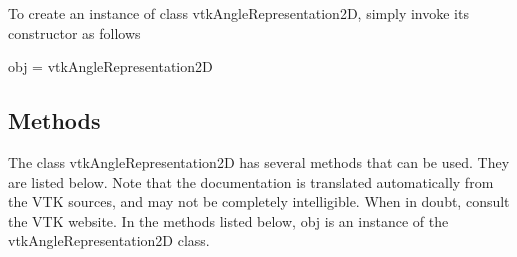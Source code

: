 To create an instance of class vtk\-Angle\-Representation2\-D, simply invoke its constructor as follows \begin{DoxyVerb}  obj = vtkAngleRepresentation2D
\end{DoxyVerb}
 \hypertarget{vtkwidgets_vtkxyplotwidget_Methods}{}\subsection{Methods}\label{vtkwidgets_vtkxyplotwidget_Methods}
The class vtk\-Angle\-Representation2\-D has several methods that can be used. They are listed below. Note that the documentation is translated automatically from the V\-T\-K sources, and may not be completely intelligible. When in doubt, consult the V\-T\-K website. In the methods listed below, {\ttfamily obj} is an instance of the vtk\-Angle\-Representation2\-D class. 
